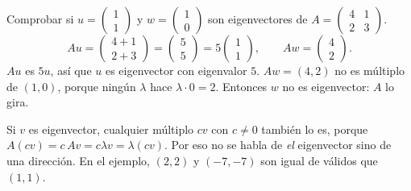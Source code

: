 \documentclass[11pt,letterpaper]{article}
\begin{document}
\begin{ejemplo}
    Comprobar si $u = \begin{pmatrix} 1 \\ 1 \end{pmatrix}$ y
    $w = \begin{pmatrix} 1 \\ 0 \end{pmatrix}$ son eigenvectores de
    $A = \begin{pmatrix} 4 & 1 \\ 2 & 3 \end{pmatrix}$.
    \[
        Au = \begin{pmatrix} 4 + 1 \\ 2 + 3 \end{pmatrix}
           = \begin{pmatrix} 5 \\ 5 \end{pmatrix}
           = 5 \begin{pmatrix} 1 \\ 1 \end{pmatrix} ,
        \qquad
        Aw = \begin{pmatrix} 4 \\ 2 \end{pmatrix} .
    \]
    $Au$ es $5u$, así que $u$ es eigenvector con eigenvalor $5$.
    $Aw = (4, 2)$ no es múltiplo de $(1, 0)$, porque ningún $\lambda$
    hace $\lambda \cdot 0 = 2$. Entonces $w$ no es eigenvector: $A$ lo
    gira.
\end{ejemplo}

Si $v$ es eigenvector, cualquier múltiplo $cv$ con $c \neq 0$ también
lo es, porque $A(cv) = c\,Av = c\lambda v = \lambda (cv)$. Por eso no
se habla de \emph{el} eigenvector sino de una dirección. En el ejemplo,
$(2, 2)$ y $(-7, -7)$ son igual de válidos que $(1, 1)$.
\end{document}
